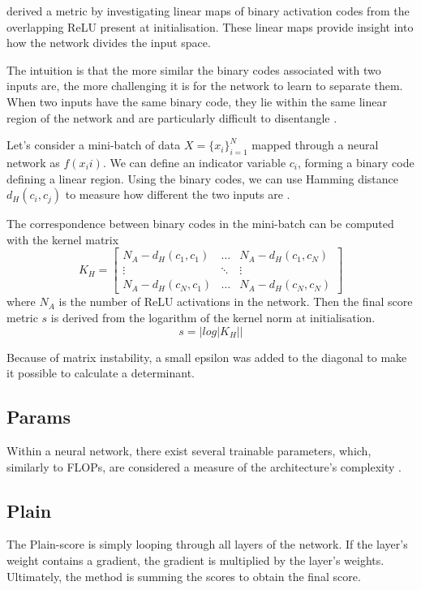 \autocite{jacob_conv} derived a metric by investigating linear maps of binary activation codes from the overlapping ReLU present at initialisation. These linear maps provide insight into how the network divides the input space.

The intuition is that the more similar the binary codes associated with two inputs are, the more challenging it is for the network to learn to separate them. When two inputs have the same binary code, they lie within the same linear region of the network and are particularly difficult to disentangle \autocite{jacob_conv}.

Let's consider a mini-batch of data $X = \{x_i\}^N_{i=1}$ mapped through a neural network as $f(x_ii)$. We can define an indicator variable $c_i$, forming a binary code defining a linear region. Using the binary codes, we can use Hamming distance $d_H(c_i, c_j)$ to measure how different the two inputs are \autocite{jacob_conv}.

The correspondence between binary codes in the mini-batch can be computed with the kernel matrix
\begin{equation} 
K_H = \begin{bmatrix} 
        N_A-d_H(c_1, c_1) & \dots & N_A-d_H(c_1, c_N) \\ 
        \vdots & \ddots & \vdots \\ 
        N_A-d_H(c_N, c_1) & \dots & N_A-d_H(c_N, c_N)
    \end{bmatrix} 
\end{equation}
where $N_A$ is the number of ReLU activations in the network. Then the final score metric $s$ is derived from the logarithm of the kernel norm at initialisation. 
\begin{equation}
s = |log|K_H||
\end{equation}


Because of matrix instability, a small epsilon was added to the diagonal to make it possible to calculate a determinant.


\subsection{Params}
Within a neural network, there exist several trainable parameters, which, similarly to \gls{FLOPs}, are considered a measure of the architecture's complexity \autocite{ning2021evaluating}. 

\subsection{Plain}
The Plain-score is simply looping through all layers of the network. If the layer's weight contains a gradient, the gradient is multiplied by the layer's weights. Ultimately, the method is summing the scores to obtain the final score. 

